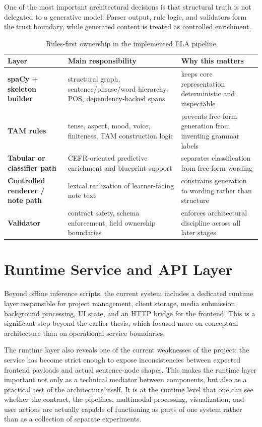 \documentclass[12pt,a4paper,oneside]{report}
\begin{document}
One of the most important architectural decisions is that structural truth is not delegated to a generative model. Parser output, rule logic, and validators form the trust boundary, while generated content is treated as controlled enrichment.

\begin{table}[H]
  \centering
  \caption{Rules-first ownership in the implemented ELA pipeline}
  \begin{tabularx}{\textwidth}{>{\bfseries}p{3.7cm}X X}
    \toprule
    Layer & Main responsibility & Why this matters \\
    \midrule
    spaCy + skeleton builder & structural graph, sentence/phrase/word hierarchy, POS, dependency-backed spans & keeps core representation deterministic and inspectable \\
    TAM rules & tense, aspect, mood, voice, finiteness, TAM construction logic & prevents free-form generation from inventing grammar labels \\
    Tabular or classifier path & CEFR-oriented predictive enrichment and blueprint support & separates classification from free-form wording \\
    Controlled renderer / note path & lexical realization of learner-facing note text & constrains generation to wording rather than structure \\
    Validator & contract safety, schema enforcement, field ownership boundaries & enforces architectural discipline across all later stages \\
    \bottomrule
  \end{tabularx}
\end{table}

\section{Runtime Service and API Layer}
Beyond offline inference scripts, the current system includes a dedicated runtime layer responsible for project management, client storage, media submission, background processing, UI state, and an HTTP bridge for the frontend. This is a significant step beyond the earlier thesis, which focused more on conceptual architecture than on operational service boundaries.

The runtime layer also reveals one of the current weaknesses of the project: the service has become strict enough to expose inconsistencies between expected frontend payloads and actual sentence-node shapes. This makes the runtime layer important not only as a technical mediator between components, but also as a practical test of the architecture itself. It is at the runtime level that one can see whether the contract, the pipelines, multimodal processing, visualization, and user actions are actually capable of functioning as parts of one system rather than as a collection of separate experiments.
\end{document}
